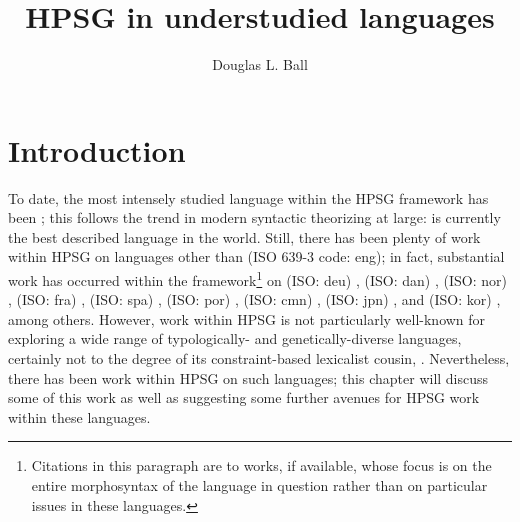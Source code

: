 \documentclass[output=paper
	        ,collection
	        ,collectionchapter
 	        ,biblatex
                ,babelshorthands
                ,newtxmath
                ,draftmode
                ,colorlinks, citecolor=brown
]{langscibook}
\title{HPSG in understudied languages}
\author{%
	Douglas L. Ball\affiliation{Truman State University}%
}
\begin{document}
\maketitle
\label{understudied-languages}


\section{Introduction}

To date, the most intensely studied language within the HPSG framework has been ; this follows the trend in modern syntactic theorizing at large:  is currently the best described language in the world. Still, there has been plenty of work within HPSG on languages other than  (ISO 639-3 code: eng); in fact, substantial work has occurred within the framework\footnote{Citations in this paragraph are  to works, if available, whose focus is on the entire morphosyntax of the language in question rather than on particular issues in these languages.} on 
 (ISO: deu) \citep{Crysmann2003b,MuellerLehrbuch3}, 
 (ISO: dan) \citep{MOeDanish}, 
 (ISO: nor) \citep{HH2004a-u}, 
 (ISO: fra) \citep{AG2000a,AG2002b-u,abegod04,ABGT2006a-u}, 
 (ISO: spa) \citep{Marimon2013a-u}, 
 (ISO: por) \citep{BC2008a-u}, 
 (ISO: cmn) \citep{ML2013a,YF2014a-u}, 
 (ISO: jpn) \citep{SBB2016a}, and 
 (ISO: kor) \citep{KYSB2011a-u}, among others. However, work within HPSG is not particularly well-known for exploring a wide range of typologically- and genetically-diverse languages, certainly not to the degree of its constraint-based lexicalist cousin, . Nevertheless, there has been work within HPSG on such languages; this chapter will discuss some of this work as well as suggesting some further avenues for HPSG work within these languages.
\end{document}
